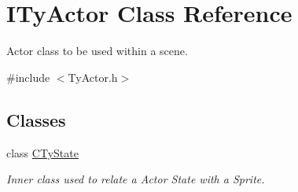 \hypertarget{class_i_ty_actor}{
\section{ITyActor Class Reference}
\label{class_i_ty_actor}
}


Actor class to be used within a scene.  




{\ttfamily \#include $<$TyActor.h$>$}

\subsection*{Classes}
\begin{DoxyCompactItemize}
\item 
class \hyperlink{class_i_ty_actor_1_1_c_ty_state}{CTyState}
\begin{DoxyCompactList}\small\item\em Inner class used to relate a Actor State with a Sprite. \end{DoxyCompactList}\end{DoxyCompactItemize}

